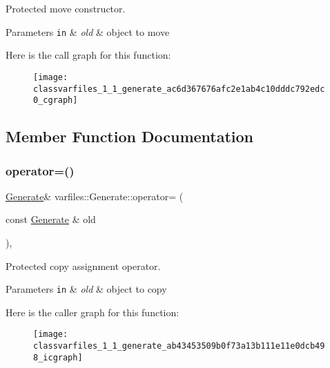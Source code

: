 Protected move constructor. 


\begin{DoxyParams}[1]{Parameters}
\mbox{\tt in}  & {\em old} & object to move \\
\hline
\end{DoxyParams}
Here is the call graph for this function\+:\nopagebreak
\begin{figure}[H]
\begin{center}
\leavevmode
\texttt{[image: classvarfiles\_1\_1\_generate\_ac6d367676afc2e1ab4c10dddc792edc0\_cgraph]}
\end{center}
\end{figure}


\subsection{Member Function Documentation}
\mbox{\label{classvarfiles_1_1_generate_ab43453509b0f73a13b111e11e0dcb498}} 
\subsubsection{\texorpdfstring{operator=()}{operator=()}\hspace{0.1cm}{\footnotesize\ttfamily [1/2]}}
{\footnotesize\ttfamily \hyperlink{classvarfiles_1_1_generate}{Generate}\& varfiles\+::\+Generate\+::operator= (\begin{DoxyParamCaption}\item[{const \hyperlink{classvarfiles_1_1_generate}{Generate} \&}]{old }\end{DoxyParamCaption})\hspace{0.3cm}{\ttfamily [protected]}, {\ttfamily [default]}}



Protected copy assignment operator. 


\begin{DoxyParams}[1]{Parameters}
\mbox{\tt in}  & {\em old} & object to copy \\
\hline
\end{DoxyParams}
Here is the caller graph for this function\+:\nopagebreak
\begin{figure}[H]
\begin{center}
\leavevmode
\texttt{[image: classvarfiles\_1\_1\_generate\_ab43453509b0f73a13b111e11e0dcb498\_icgraph]}
\end{center}
\end{figure}
\mbox{\label{classvarfiles_1_1_generate_a6e63f2d9f9570f38d4d67f51a770a0b2}} 
